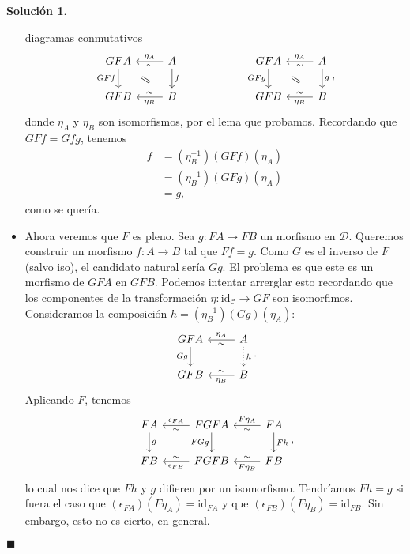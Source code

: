 \documentclass[12pt,letterpaper,titlepage]{article}
\newcommand{\xqed}[1]{%
  \leavevmode\unskip\penalty9999 \hbox{}\nobreak\hfill
  \quad\hbox{\ensuremath{#1}}}
\theoremstyle{definition}
\newtheorem*{soltemp}{Solución}
\newenvironment{sol}[1]{%
    \begin{soltemp}#1}{%
    \xqed{\blacksquare}\end{soltemp}%
}
\renewcommand\cal[1]{\mathcal{#1}}
\newcommand\com[2]{\ar[equal,from={#1},to={#2},shorten=5mm]}
\newcommand\<{\langle}
\renewcommand\>{\rangle}
\newcommand{\id}{\mathrm{id}}
\begin{document}
\begin{sol}
\begin{itemize}
        diagramas conmutativos
        \[
        \begin{tikzcd}
            GFA \ar[d,"GFf"'] & A \ar[l,"\eta_A"',"\sim"] \ar[d,"f"] \\
            GFB & B \ar[l,"\eta_B","\sim"']
            \com{1-1}{2-2}
        \end{tikzcd}
        \hspace{20mm}
        \begin{tikzcd}
            GFA \ar[d,"GFg"'] & A \ar[l,"\eta_A"',"\sim"] \ar[d,"g"] \\
            GFB & B \ar[l,"\eta_B","\sim"']
            \com{1-1}{2-2}
        \end{tikzcd}
        ,\]
        donde $\eta_A$ y $\eta_B$ son isomorfismos, por el lema que probamos.
        Recordando que $GFf=Gfg$, tenemos
        \begin{align*}
            f
            &= (\eta_B^{-1})(GFf)(\eta_A) \\
            &= (\eta_B^{-1})(GFg)(\eta_A) \\
            &= g,
        \end{align*}
        como se quería.
        
        \item
        Ahora veremos que $F$ es pleno.
        Sea $g:FA\to FB$ un morfismo en $\cal D$.
        Queremos construir un morfismo $f:A\to B$ tal que $Ff=g$.
        Como $G$ es el inverso de $F$ (salvo iso),
        el candidato natural sería $Gg$.
        El problema es que este es un
        morfismo de $GFA$ en $GFB$.
        Podemos intentar arrerglar esto recordando que los componentes de
        la transformación $\eta:\id_{\cal C} \to GF$ son isomorfimos.
        Consideramos la composición $h=(\eta_B^{-1})(Gg)(\eta_A)$:
        \[
        \begin{tikzcd}
            GFA \ar[d,"Gg"'] & A \ar[l,"\eta_A"',"\sim"] 
            \ar[d,"h",dotted]\\
            GFB & B \ar[l,"\eta_B","\sim"']
        \end{tikzcd}
        .\]
        Aplicando $F$, tenemos
        \[
        \begin{tikzcd}
            FA \ar[d,"g"]
                & \ar[l,"\epsilon_{FA}"',"\sim"] FGFA \ar[d,"FGg"']
                & FA \ar[l,"F\eta_A"',"\sim"]  \ar[d,"Fh"]\\
            FB  & FGFB \ar[l,"\epsilon_{FB}","\sim"']
                & FB \ar[l,"F\eta_B","\sim"']
        \end{tikzcd}
        ,\]
        lo cual nos dice que $Fh$ y $g$ difieren por un isomorfismo.
        Tendríamos $Fh=g$ si fuera el caso que
        $(\epsilon_{FA})(F\eta_A)=\id_{FA}$
        y que $(\epsilon_{FB})(F\eta_B)=\id_{FB}$.
        Sin embargo, esto no es cierto, en general.
        

\end{itemize}
\end{sol}
\end{document}

